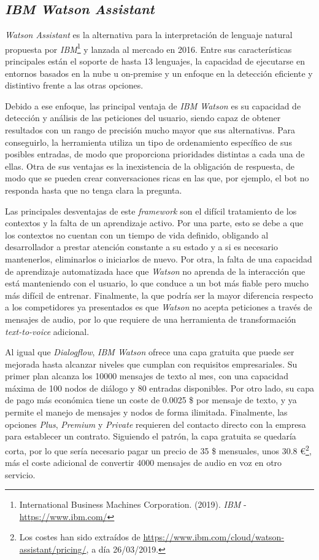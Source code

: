 \documentclass[11pt,spanish,listoffigures]{tfgetsinf}
\begin{document}
\subsection{\textit{IBM Watson Assistant}}
\label{sec:ibm-watson-assistant}

\textit{Watson Assistant} es la alternativa para la interpretación de lenguaje natural propuesta por \textit{IBM}\footnote{International Business Machines Corporation. (2019). \textit{IBM} - \url{https://www.ibm.com/}} y lanzada al mercado en 2016. Entre sus características principales están el soporte de hasta 13 lenguajes, la capacidad de ejecutarse en entornos basados en la nube u \gls{on-premise} y un enfoque en la detección eficiente y distintivo frente a las otras opciones.

Debido a ese enfoque, las principal ventaja de \textit{IBM Watson} es su capacidad de detección y análisis de las peticiones del usuario, siendo capaz de obtener resultados con un rango de precisión mucho mayor que sus alternativas. Para conseguirlo, la herramienta utiliza un tipo de ordenamiento específico de sus posibles entradas, de modo que proporciona prioridades distintas a cada una de ellas. Otra de sus ventajas es la inexistencia de la obligación de respuesta, de modo que se pueden crear conversaciones ricas en las que, por ejemplo, el bot no responda hasta que no tenga clara la pregunta.

Las principales desventajas de este \textit{framework} son el difícil tratamiento de los contextos y la falta de un aprendizaje activo. Por una parte, esto se debe a que los contextos no cuentan con un tiempo de vida definido, obligando al desarrollador a prestar atención constante a su estado y a si es necesario mantenerlos, eliminarlos o iniciarlos de nuevo. Por otra, la falta de una capacidad de aprendizaje automatizada hace que \textit{Watson} no aprenda de la interacción que está manteniendo con el usuario, lo que conduce a un bot más fiable pero mucho más difícil de entrenar. Finalmente, la que podría ser la mayor diferencia respecto a los competidores ya presentados es que \textit{Watson} no acepta peticiones a través de mensajes de audio, por lo que requiere de una herramienta de transformación \textit{text-to-voice} adicional.

Al igual que \textit{Dialogflow}, \textit{IBM Watson} ofrece una capa gratuita que puede ser mejorada hasta alcanzar niveles que cumplan con requisitos empresariales. Su primer plan alcanza los 10000 mensajes de texto al mes, con una capacidad máxima de 100 nodos de diálogo y 80 entradas disponibles. Por otro lado, su capa de pago más económica tiene un coste de 0.0025 \$ por mensaje de texto, y ya permite el manejo de mensajes y nodos de forma ilimitada. Finalmente, las opciones \textit{Plus}, \textit{Premium} y \textit{Private} requieren del contacto directo con la empresa para establecer un contrato. Siguiendo el patrón, la capa gratuita se quedaría corta, por lo que sería necesario pagar un precio de 35 \$ mensuales, unos 30.8 \euro\footnote{Los costes han sido extraídos de \url{https://www.ibm.com/cloud/watson-assistant/pricing/}, a día 26/03/2019.}, más el coste adicional de convertir 4000 mensajes de audio en voz en otro servicio.
\end{document}
